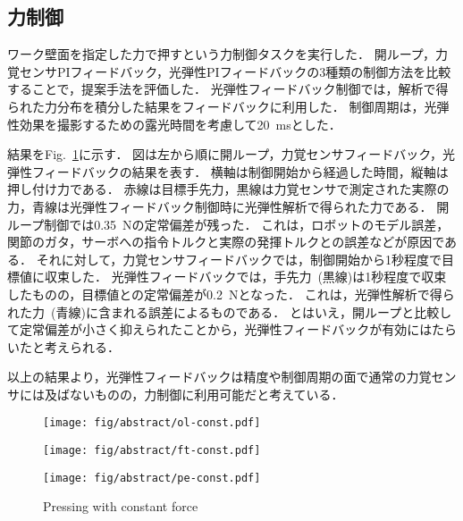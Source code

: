 \documentclass[a4paper,papersize,dvipdfmx]{mtabst}
\newcommand{\figref}[1]{Fig.~\ref{#1}}
\begin{document}
\subsection{力制御}
ワーク壁面を指定した力で押すという力制御タスクを実行した．
開ループ，力覚センサPIフィードバック，光弾性PIフィードバックの3種類の制御方法を比較することで，提案手法を評価した．
光弾性フィードバック制御では，解析で得られた力分布を積分した結果をフィードバックに利用した．
制御周期は，光弾性効果を撮影するための露光時間を考慮して20~msとした．

結果を\figref{fig:const}に示す．
図は左から順に開ループ，力覚センサフィードバック，光弾性フィードバックの結果を表す．
横軸は制御開始から経過した時間，縦軸は押し付け力である．
赤線は目標手先力，黒線は力覚センサで測定された実際の力，青線は光弾性フィードバック制御時に光弾性解析で得られた力である．
開ループ制御では0.35~Nの定常偏差が残った．
これは，ロボットのモデル誤差，関節のガタ，サーボへの指令トルクと実際の発揮トルクとの誤差などが原因である．
それに対して，力覚センサフィードバックでは，制御開始から1秒程度で目標値に収束した．
光弾性フィードバックでは，手先力~(黒線)は1秒程度で収束したものの，目標値との定常偏差が0.2~Nとなった．
これは，光弾性解析で得られた力~(青線)に含まれる誤差によるものである．
とはいえ，開ループと比較して定常偏差が小さく抑えられたことから，光弾性フィードバックが有効にはたらいたと考えられる．

以上の結果より，光弾性フィードバックは精度や制御周期の面で通常の力覚センサには及ばないものの，力制御に利用可能だと考えている．

\begin{figure}[bt]
    \centering
    \begin{minipage}[t]{0.32\linewidth}
        \centering
        \texttt{[image: fig/abstract/ol-const.pdf]}
        \label{fig:const-feedforward}
    \end{minipage}
    \begin{minipage}[t]{0.32\linewidth}
        \centering
        \texttt{[image: fig/abstract/ft-const.pdf]}
        \label{fig:const-ft-feedback}
    \end{minipage}
    \begin{minipage}[t]{0.32\linewidth}
        \centering
        \texttt{[image: fig/abstract/pe-const.pdf]}
        \label{fig:const-pe-feedback}
    \end{minipage}
    \caption{Pressing with constant force}\label{fig:const}
\end{figure}
\end{document}
